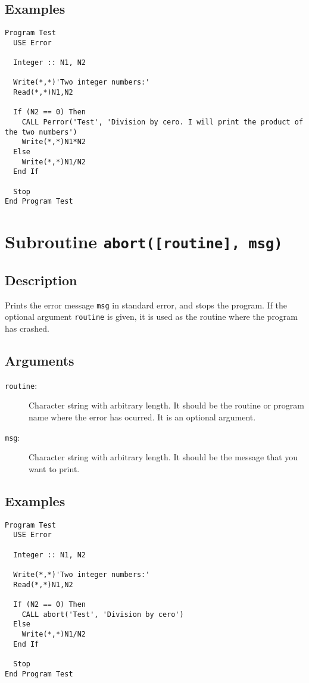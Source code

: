\subsection{Examples}

\begin{verbatim}
Program Test
  USE Error

  Integer :: N1, N2

  Write(*,*)'Two integer numbers:'
  Read(*,*)N1,N2

  If (N2 == 0) Then
    CALL Perror('Test', 'Division by cero. I will print the product of the two numbers')
    Write(*,*)N1*N2
  Else 
    Write(*,*)N1/N2
  End If

  Stop
End Program Test
\end{verbatim}

\section{Subroutine \texttt{abort([routine], msg)}}

\subsection{Description}

Prints the error message \texttt{msg} in standard error, and stops the
program. If the optional argument \texttt{routine} is given, it is
used as the routine where the program has crashed.

\subsection{Arguments}

\begin{description}
\item[\texttt{routine}:] Character string with arbitrary length. It
  should be the routine or program name where the error has
  ocurred. It is an optional argument.
\item[\texttt{msg}:] Character string with arbitrary length. It
  should be the message that you want to print.
\end{description}


\subsection{Examples}

\begin{verbatim}
Program Test
  USE Error

  Integer :: N1, N2

  Write(*,*)'Two integer numbers:'
  Read(*,*)N1,N2

  If (N2 == 0) Then
    CALL abort('Test', 'Division by cero')
  Else 
    Write(*,*)N1/N2
  End If

  Stop
End Program Test
\end{verbatim}

